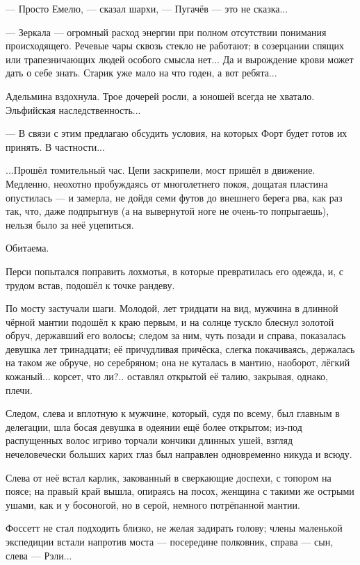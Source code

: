 --- Просто Емелю, --- сказал шархи, --- Пугачёв --- это не сказка...

--- Зеркала --- огромный расход энергии при полном отсутствии понимания происходящего.
Речевые чары сквозь стекло не работают; в созерцании спящих или трапезничающих людей особого смысла нет...
Да и вырождение крови может дать о себе знать. Старик уже мало на что годен, а вот ребята...

Адельмина вздохнула. Трое дочерей росли, а юношей всегда не хватало. Эльфийская наследственность...

--- В связи с этим предлагаю обсудить условия, на которых Форт будет готов их принять. В частности...

\emptypar

...Прошёл томительный час. Цепи заскрипели, мост пришёл в движение.
Медленно, неохотно пробуждаясь от многолетнего покоя, дощатая пластина опустилась --- и замерла,
не дойдя семи футов до внешнего берега рва, как раз так, что, даже подпрыгнув (а на вывернутой ноге не очень-то попрыгаешь),
нельзя было за неё уцепиться.

Обитаема.

Перси попытался поправить лохмотья, в которые превратилась его одежда, и, с трудом встав, подошёл к точке рандеву.

\emptypar

По мосту застучали шаги.
Молодой, лет тридцати на вид, мужчина в длинной чёрной мантии подошёл к краю первым,
и на солнце тускло блеснул золотой обруч, державший его волосы; следом за ним, чуть позади и справа,
показалась девушка лет тринадцати; её причудливая причёска, слегка покачиваясь, держалась на таком же обруче, но серебряном;
она не куталась в мантию, наоборот, лёгкий кожаный... корсет, что ли?.. оставлял открытой её талию, закрывая, однако, плечи.

\emptypar

Следом, слева и вплотную к мужчине, который, судя по всему, был главным в делегации,
шла босая девушка в одеянии ещё более открытом; из-под распущенных волос игриво торчали кончики длинных ушей,
взгляд нечеловечески больших карих глаз был направлен одновременно никуда и всюду.

Слева от неё встал карлик, закованный в сверкающие доспехи, с топором на поясе;
на правый край вышла, опираясь на посох, женщина с такими же острыми ушами, как и у босоногой, но в серой,
немного потрёпанной мантии.

Фоссетт не стал подходить близко, не желая задирать голову; члены маленькой экспедиции встали напротив моста ---
посередине полковник, справа --- сын, слева --- Рэли...

